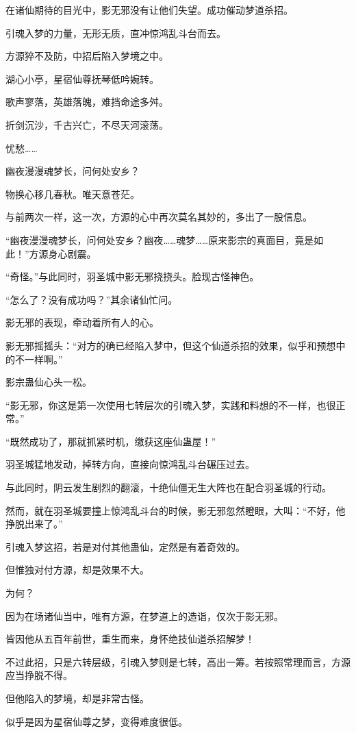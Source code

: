 \begin{this_body}
在诸仙期待的目光中，影无邪没有让他们失望。成功催动梦道杀招。

引魂入梦的力量，无形无质，直冲惊鸿乱斗台而去。

方源猝不及防，中招后陷入梦境之中。

湖心小亭，星宿仙尊抚琴低吟婉转。

歌声寥落，英雄落魄，难挡命途多舛。

折剑沉沙，千古兴亡，不尽天河滚荡。

忧愁……

幽夜漫漫魂梦长，问何处安乡？

物换心移几春秋。唯天意苍茫。

与前两次一样，这一次，方源的心中再次莫名其妙的，多出了一股信息。

“幽夜漫漫魂梦长，问何处安乡？幽夜……魂梦……原来影宗的真面目，竟是如此！”方源身心剧震。

“奇怪。”与此同时，羽圣城中影无邪挠挠头。脸现古怪神色。

“怎么了？没有成功吗？”其余诸仙忙问。

影无邪的表现，牵动着所有人的心。

影无邪摇摇头：“对方的确已经陷入梦中，但这个仙道杀招的效果，似乎和预想中的不一样啊。”

影宗蛊仙心头一松。

“影无邪，你这是第一次使用七转层次的引魂入梦，实践和料想的不一样，也很正常。”

“既然成功了，那就抓紧时机，缴获这座仙蛊屋！”

羽圣城猛地发动，掉转方向，直接向惊鸿乱斗台碾压过去。

与此同时，阴云发生剧烈的翻滚，十绝仙僵无生大阵也在配合羽圣城的行动。

然而，就在羽圣城要撞上惊鸿乱斗台的时候，影无邪忽然瞪眼，大叫：“不好，他挣脱出来了。”

引魂入梦这招，若是对付其他蛊仙，定然是有着奇效的。

但惟独对付方源，却是效果不大。

为何？

因为在场诸仙当中，唯有方源，在梦道上的造诣，仅次于影无邪。

皆因他从五百年前世，重生而来，身怀绝技仙道杀招解梦！

不过此招，只是六转层级，引魂入梦则是七转，高出一筹。若按照常理而言，方源应当挣脱不得。

但他陷入的梦境，却是非常古怪。

似乎是因为星宿仙尊之梦，变得难度很低。


\end{this_body}
